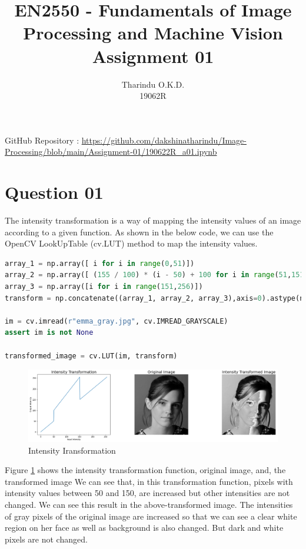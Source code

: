 \documentclass[a4paper]{article}
\title{\textbf{EN2550 - Fundamentals of Image Processing and Machine Vision}\\
Assignment 01}
\author{Tharindu O.K.D.\\19062R}
\begin{document}
\maketitle
GitHub Repository : \url{https://github.com/dakshinatharindu/Image-Processing/blob/main/Assignment-01/190622R_a01.ipynb}
\section*{Question 01}

The intensity transformation is a way of mapping the intensity values of
 an image according to a given function. As shown in the below code, we
  can use the OpenCV LookUpTable (cv.LUT) method to map the intensity values.


\begin{lstlisting}[language=python, caption=Intensity Iransformation, label=q1c]
array_1 = np.array([ i for i in range(0,51)])
array_2 = np.array([ (155 / 100) * (i - 50) + 100 for i in range(51,151)])
array_3 = np.array([i for i in range(151,256)])
transform = np.concatenate((array_1, array_2, array_3),axis=0).astype(np.uint8)

im = cv.imread(r"emma_gray.jpg", cv.IMREAD_GRAYSCALE)
assert im is not None

transformed_image = cv.LUT(im, transform)
\end{lstlisting}

    
\begin{figure}[!htb]
    \centering

    \includegraphics[width=\textwidth]{../q1.png}
    \caption{Intensity Iransformation}

    \label{figq1}
\end{figure}
Figure \ref{figq1} shows the intensity transformation function,
 original image, and, the transformed image
We can see that, in this transformation function,
 pixels with intensity values between 50 and 150,
  are increased but other intensities are not changed.
   We can see this result in the above-transformed image.
    The intensities of gray pixels of the original image
     are increased so that we can see a clear white region
      on her face as well as background is also changed. But dark and white pixels are not changed.
\end{document}
